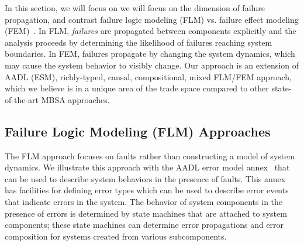 In this section, we will focus on we will focus on the dimension of failure propagation, and contrast failure logic modeling (FLM) vs. failure effect modeling (FEM)~\cite{5979344}.  In FLM, {\em failures} are propagated between components explicitly and the analysis proceeds by determining the likelihood of failures reaching system boundaries.  In FEM, failures propagate by changing the system dynamics, which may cause the system behavior to visibly change.  Our approach is an extension of AADL (ESM), richly-typed, causal, compositional, mixed FLM/FEM approach, which we believe is in a unique area of the trade space compared to other state-of-the-art MBSA approaches.



\subsection{Failure Logic Modeling (FLM) Approaches}




The FLM approach focuses on faults rather than constructing a model of system dynamics. We illustrate this approach with the AADL error model annex~\cite{SAEAS} that can be used to describe system behaviors in the presence of faults. This annex has facilities for defining error types which can be used to describe error events that indicate errors in the system. The behavior of system components in the presence of errors is determined by state machines that are attached to system components; these state machines can determine error propagations and error composition for systems created from various subcomponents.

